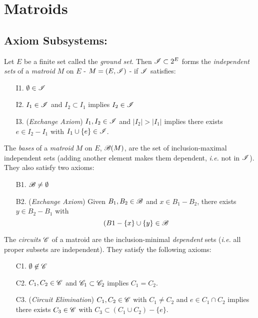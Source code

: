 \section{Matroids}

\subsection{Axiom Subsystems:}

\begin{definition}
    Let $E$ be a finite set called the \textit{ground set}.
    Then $\mathscr{I} \subset 2^E$ forms the \textit{independent sets} of a \textit{matroid} $M$ on $E$ - $M = (E, \mathscr{I})$ - if $\mathscr{I}$ satisfies:
    \begin{enumerate}
        \item[I1.] $\emptyset \in \mathscr{I}$
        \item[I2.] $I_1 \in \mathscr{I}$ and $I_2 \subset I_1$ implies $I_2 \in \mathscr{I}$
        \item[I3.] (\textit{Exchange Axiom}) $I_1, I_2 \in \mathscr{I}$ and $|I_2| > |I_1|$ implies there exists $e \in I_2 - I_1$ with $I_1 \cup \lbrace e \rbrace \in \mathscr{I}$.
    \end{enumerate}
\end{definition}    

\begin{definition}[Bases]
    The \textit{bases} of a \textit{matroid} $M$ on $E$, $\mathscr{B}(M)$, are the set of inclusion-maximal independent sets (adding another element makes them dependent, \textit{i.e.} not in $\mathscr{I}$).
    They also satisfy two axioms:
    \begin{enumerate}
        \item[B1.] $\mathscr{B} \neq \emptyset$
        \item[B2.] (\textit{Exchange Axiom}) Given $B_1, B_2 \in \mathscr{B}$ and $x \in B_1 - B_2$, there exists $y \in B_2 - B_1$ with
            $$ (B1 - \{ x\} \cup \{ y\} \in \mathscr{B}$$
    \end{enumerate}
\end{definition}

\begin{definition}[Circuits]
    The \textit{circuits} $\mathscr{C}$ of a matroid are the inclusion-minimal \textit{dependent} sets (\textit{i.e.} all proper subsets are independent).
    They satisfy the following axioms:
    \begin{enumerate}
        \item[C1.] $\emptyset \not\in \mathscr{C}$
        \item[C2.] $C_1, C_2 \in \mathscr{C}$ and $\mathscr{C}_1 \subset \mathscr{C}_2$ implies $C_1 = C_2$.
        \item[C3.] (\textit{Circuit Elimination}) $C_1, C_2 \in \mathscr{C}$ with $C_1 \neq C_2$ and $e \in C_1 \cap C_2$ implies there exists $C_3 \in \mathscr{C}$ with $C_3 \subset (C_1 \cup C_2) - \{ e \}$.
    \end{enumerate}
\end{definition}

